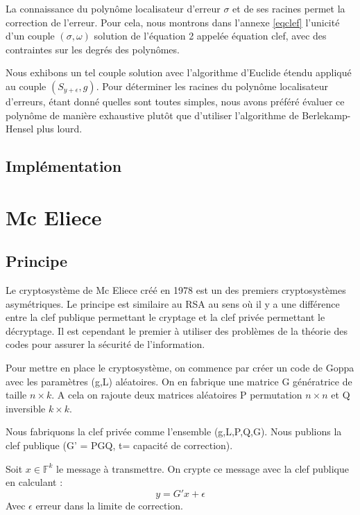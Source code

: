 \documentclass{article}
\begin{document}
			La connaissance du polynôme localisateur d'erreur $\sigma$ et de ses racines permet la correction de l'erreur.
			Pour cela, nous montrons dans l'annexe \ref{eqclef} l'unicité d'un couple $ (\sigma,\omega) $ solution de l'équation 2 appelée équation clef, avec des contraintes sur les degrés des polynômes.

			Nous exhibons un tel couple solution avec l'algorithme d'Euclide étendu appliqué au couple $ (S_{y+\epsilon},g) $.
			Pour déterminer les racines du polynôme localisateur d'erreurs, étant donné quelles sont toutes simples, nous avons préféré évaluer ce polynôme de manière exhaustive plutôt que d'utiliser l'algorithme de Berlekamp-Hensel plus lourd.

		\subsection*{Implémentation}
			


	\section{Mc Eliece}

		\subsection*{Principe}
			Le cryptosystème de Mc Eliece créé en 1978 est un des premiers cryptosystèmes asymétriques.
			Le principe est similaire au RSA au sens où il y a une différence entre la clef publique permettant le cryptage et la clef privée permettant le décryptage.
			Il est cependant le premier à utiliser des problèmes de la théorie des codes pour assurer la sécurité de l'information.

			Pour mettre en place le cryptosystème, on commence par créer un code de Goppa avec les paramètres (g,L) aléatoires.
			On en fabrique une matrice G génératrice de taille $n\times k$.
			A cela on rajoute deux matrices aléatoires P permutation $n\times n$ et Q inversible $k \times k$.

			Nous fabriquons la clef privée comme l'ensemble (g,L,P,Q,G).
			Nous publions la clef publique (G' = PGQ, t= capacité de correction).

			Soit $x\in \mathbb{F}^{k}$ le message à transmettre.
			On crypte ce message avec la clef publique en calculant :
			$$
				y = G'x + \epsilon
			$$
			Avec $\epsilon$ erreur dans la limite de correction.
\end{document}
